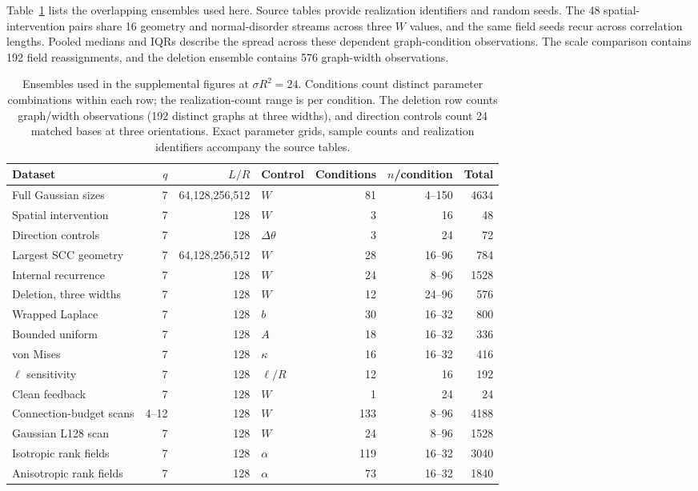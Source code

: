 \documentclass[11pt]{article}
\begin{document}
Table~\ref{tab:inventory} lists the overlapping ensembles used here. Source tables provide realization identifiers and random seeds. The 48 spatial-intervention pairs share 16 geometry and normal-disorder streams across three $W$ values, and the same field seeds recur across correlation lengths. Pooled medians and IQRs describe the spread across these dependent graph-condition observations. The scale comparison contains 192 field reassignments, and the deletion ensemble contains 576 graph-width observations.


\begin{table}[H]\centering\small
\caption{Ensembles used in the supplemental figures at $\sigma R^2=24$. Conditions count distinct parameter combinations within each row; the realization-count range is per condition. The deletion row counts graph/width observations (192 distinct graphs at three widths), and direction controls count 24 matched bases at three orientations. Exact parameter grids, sample counts and realization identifiers accompany the source tables.}\label{tab:inventory}
\begin{tabular}{lrrlrrr}
\toprule
Dataset & $q$ & $L/R$ & Control & Conditions & $n$/condition & Total \\
\midrule
Full Gaussian sizes & 7 & 64,128,256,512 & $W$ & 81 & 4--150 & 4634 \\
Spatial intervention & 7 & 128 & $W$ & 3 & 16 & 48 \\
Direction controls & 7 & 128 & $\Delta\theta$ & 3 & 24 & 72 \\
Largest SCC geometry & 7 & 64,128,256,512 & $W$ & 28 & 16--96 & 784 \\
Internal recurrence & 7 & 128 & $W$ & 24 & 8--96 & 1528 \\
Deletion, three widths & 7 & 128 & $W$ & 12 & 24--96 & 576 \\
Wrapped Laplace & 7 & 128 & $b$ & 30 & 16--32 & 800 \\
Bounded uniform & 7 & 128 & $A$ & 18 & 16--32 & 336 \\
von Mises & 7 & 128 & $\kappa$ & 16 & 16--32 & 416 \\
$\ell$ sensitivity & 7 & 128 & $\ell/R$ & 12 & 16 & 192 \\
Clean feedback & 7 & 128 & $W$ & 1 & 24 & 24 \\
Connection-budget scans & 4--12 & 128 & $W$ & 133 & 8--96 & 4188 \\
Gaussian L128 scan & 7 & 128 & $W$ & 24 & 8--96 & 1528 \\
Isotropic rank fields & 7 & 128 & $\alpha$ & 119 & 16--32 & 3040 \\
Anisotropic rank fields & 7 & 128 & $\alpha$ & 73 & 16--32 & 1840 \\
\bottomrule\end{tabular}\end{table}
\end{document}
